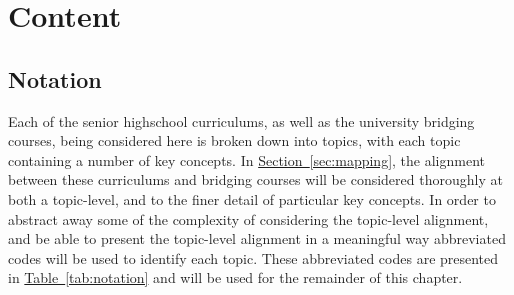 \documentclass[twoside,12pt,a4paper]{report}
\newcommand{\refsec}[1]{\hyperref[sec:#1]{Section~\ref{sec:#1}}}
\newcommand{\reftab}[1]{\hyperref[tab:#1]{Table~\ref{tab:#1}}}
\begin{document}

\section{Content}
\label{sec:content}

\subsection{Notation}

Each of the senior highschool curriculums, as well as the university bridging courses, being considered here is broken down into topics, with each topic containing a number of key concepts. In \refsec{mapping}, the alignment between these curriculums and bridging courses will be considered thoroughly at both a topic-level, and to the finer detail of particular key concepts. In order to abstract away some of the complexity of considering the topic-level alignment, and be able to present the topic-level alignment in a meaningful way abbreviated codes will be used to identify each topic. These abbreviated codes are presented in \reftab{notation} and will be used for the remainder of this chapter.
\end{document}
